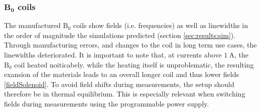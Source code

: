         \subsubsection{$\mathbf{B_0}$ coils}
            The manufactured $\mathrm{B_0}$ coils show fields (i.e. frequencies) as well as  linewidths in the order of magnitude the simulations predicted (section \ref{sec:results:sim}). Through manufacturing errors, and changes to the coil in long term use cases, the linewidths deteriorated. It is important to note that, at currents above $\SI{1}{\ampere}$, the $\mathrm{B_0}$ coil heated noiticabely. while the heating itself is unproblematic, the resulting exansion of the materials leads to an overall longer coil and thus lower fields \ref{fieldSolenoid}. To avoid field shifts during measurements, the setup should therefore be in thermal equilibrium. This is especially relevant when switching fields during measurements using the programmable power supply.
